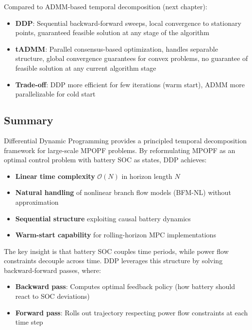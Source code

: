 Compared to ADMM-based temporal decomposition (next chapter):
\begin{itemize}
    \item \textbf{DDP}: Sequential backward-forward sweeps, local convergence to stationary points, guaranteed feasible solution at any stage of the algorithm
    \item \textbf{tADMM}: Parallel consensus-based optimization, handles separable structure, global convergence guarantees for convex problems, no guarantee of feasible solution at any current algorithm stage
    \item \textbf{Trade-off}: DDP more efficient for few iterations (warm start), ADMM more parallelizable for cold start
\end{itemize}

\subsection{Summary}

Differential Dynamic Programming provides a principled temporal decomposition framework for large-scale MPOPF problems. By reformulating MPOPF as an optimal control problem with battery SOC as states, DDP achieves:

\begin{itemize}
    \item \textbf{Linear time complexity} $\mathcal{O}(N)$ in horizon length $N$
    \item \textbf{Natural handling} of nonlinear branch flow models (BFM-NL) without approximation
    \item \textbf{Sequential structure} exploiting causal battery dynamics
    \item \textbf{Warm-start capability} for rolling-horizon MPC implementations
\end{itemize}

The key insight is that battery SOC couples time periods, while power flow constraints decouple across time. DDP leverages this structure by solving backward-forward passes, where:
\begin{itemize}
    \item \textbf{Backward pass}: Computes optimal feedback policy (how battery should react to SOC deviations)
    \item \textbf{Forward pass}: Rolls out trajectory respecting power flow constraints at each time step
\end{itemize}

